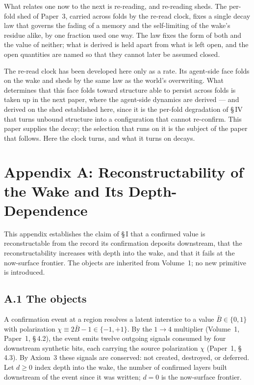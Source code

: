\documentclass[11pt,oneside]{report}
\theoremstyle{definition}
\theoremstyle{remark}
\begin{document}
What relates one now to the next is re-reading, and re-reading sheds. The
per-fold shed of Paper~3, carried across folds by the re-read clock, fixes
a single decay law that governs the fading of a memory and the
self-limiting of the wake's residue alike, by one fraction used one way.
The law fixes the form of both and the value of neither; what is derived
is held apart from what is left open, and the open quantities are named so
that they cannot later be assumed closed.

The re-read clock has been developed here only as a rate. Its agent-side
face folds on the wake and sheds by the same law as the world's
overwriting. What determines that this face folds toward structure able to
persist across folds is taken up in the next paper, where the agent-side
dynamics are derived --- and derived on the shed established here, since it
is the per-fold degradation of \S\,IV that turns unbound structure into a
configuration that cannot re-confirm. This paper supplies the decay; the
selection that runs on it is the subject of the paper that follows. Here
the clock turns, and what it turns on decays.

\section*{Appendix A: Reconstructability of the Wake and Its Depth-Dependence}

This appendix establishes the claim of \S\,I that a confirmed value is
reconstructable from the record its confirmation deposits downstream, that
the reconstructability increases with depth into the wake, and that it
fails at the now-surface frontier. The objects are inherited from
Volume~1; no new primitive is introduced.

\subsection*{A.1 The objects}

A confirmation event at a region resolves a latent interstice to a value
\ensuremath{\bar{B} \in \{0,1\}} with polarization
\ensuremath{\chi \equiv 2\bar{B} - 1 \in \{-1,+1\}}. By the
\ensuremath{1\to 4} multiplier (Volume~1, Paper~1, \S\,4.2), the event
emits twelve outgoing signals consumed by four downstream synthetic bits,
each carrying the source polarization \ensuremath{\chi} (Paper~1,
\S\,4.3). By Axiom~3 these signals are conserved: not created, destroyed,
or deferred. Let \ensuremath{d \geq 0} index depth into the wake, the
number of confirmed layers built downstream of the event since it was
written; \ensuremath{d = 0} is the now-surface frontier.
\end{document}
